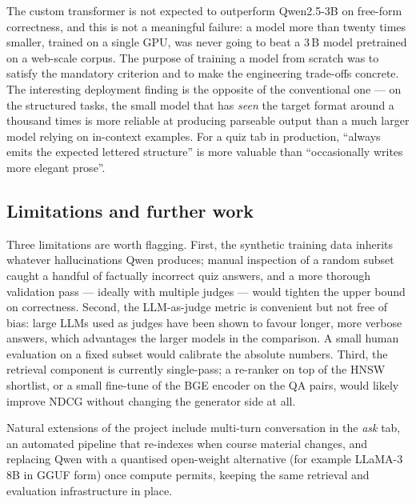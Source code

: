 The custom transformer is not expected to outperform Qwen2.5-3B on free-form correctness,
and this is not a meaningful failure: a model more than twenty times smaller, trained on a
single GPU, was never going to beat a 3\,B model pretrained on a web-scale corpus. The
purpose of training a model from scratch was to satisfy the mandatory criterion and to make
the engineering trade-offs concrete. The interesting deployment finding is the opposite of
the conventional one --- on the structured tasks, the small model that has \emph{seen} the
target format around a thousand times is more reliable at producing parseable output than a
much larger model relying on in-context examples. For a quiz tab in production, ``always
emits the expected lettered structure'' is more valuable than ``occasionally writes more
elegant prose''.

\subsection*{Limitations and further work}

Three limitations are worth flagging. First, the synthetic training data inherits whatever
hallucinations Qwen produces; manual inspection of a random subset caught a handful of
factually incorrect quiz answers, and a more thorough validation pass --- ideally with
multiple judges --- would tighten the upper bound on correctness. Second, the LLM-as-judge
metric is convenient but not free of bias: large LLMs used as judges have been shown to
favour longer, more verbose answers, which advantages the larger models in the comparison.
A small human evaluation on a fixed subset would calibrate the absolute numbers. Third, the
retrieval
component is currently single-pass; a re-ranker on top of the HNSW shortlist, or a small
fine-tune of the BGE encoder on the QA pairs, would likely improve NDCG without changing
the generator side at all.

Natural extensions of the project include multi-turn conversation in the \emph{ask} tab, an
automated pipeline that re-indexes when course material changes, and replacing Qwen with a
quantised open-weight alternative (for example LLaMA-3 8B in GGUF form) once compute permits,
keeping the same retrieval and evaluation infrastructure in place.

